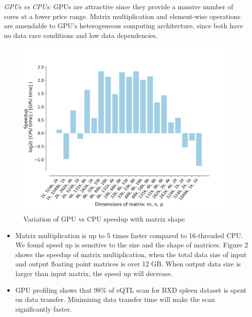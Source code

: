 \documentclass[9pt,twocolumn,twoside,lineno]{gsag3jnl}
\begin{document}
 {\em GPUs vs CPUs:} GPUs are attractive since they provide a
massive number of cores at a lower price range.
Matrix multiplication and element-wise operations are amendable
to GPU's heterogeneous computing architecture, since both have
no data race conditions and low data dependencies.
\begin{figure}[!htb]
	\centering
	\caption{Variation of GPU vs CPU speedup with matrix shape
	}
	\label{GPUCPUShape}
	\includegraphics[scale = 0.36]{figs/speedup.png}
\end{figure} 


\begin{itemize}
	\item Matrix multiplication is up to 5 times faster
	compared to 16-threaded CPU.
	We found speed
	up is sensitive to the size and the shape of matrices.
	Figure 2 shows the speedup of matrix
	multiplication, when the total data size of input and output
	floating point matrices is over 12 GB.
	When output data size is
	larger than input matrix, the speed up will decrease. 
	\item  GPU profiling shows that 98\% of eQTL scan for BXD
	spleen dataset is spent on data transfer.
	Minimizing data transfer time will make the scan significantly
	faster.
\end{itemize}
\end{document}
